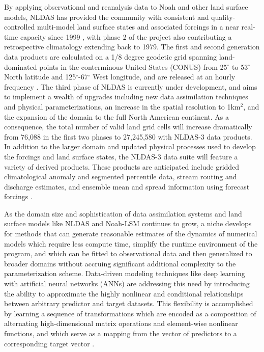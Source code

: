 By applying observational and reanalysis data to Noah and other land surface models, NLDAS has provided the community with consistent and quality-controlled multi-model land surface states and associated forcings in a near real-time capacity since 1999 \parencite{cosgrove_real-time_2003}, with phase 2 of the project also contributing a retrospective climatology extending back to 1979. The first and second generation data products are calculated on a 1/8 degree geodetic grid spanning land-dominated points in the conterminous United States (CONUS) from 25$^\circ$ to 53$^\circ$ North latitude and 125$^\circ$-67$^\circ$ West longitude, and are released at an hourly frequency  \parencite{mitchell_multi-institution_2004} \parencite{xia_continental-scale_2012}. The third phase of NLDAS is currently under development, and aims to implement a wealth of upgrades including new data assimilation techniques and physical parameterizations, an increase in the spatial resolution to 1km$^2$, and the expansion of the domain to the full North American continent. As a consequence, the total number of valid land grid cells will increase dramatically from 76,088 in the first two phases to 27,245,580 with NLDAS-3 data products. In addition to the larger domain and updated physical processes used to develop the forcings and land surface states, the NLDAS-3 data suite will feature a variety of derived products. These products are anticipated include gridded climatological anomaly and segmented percentile data, stream routing and discharge estimates, and ensemble mean and spread information using forecast forcings \parencite{kumar_north_2024}.

As the domain size and sophistication of data assimilation systems and land surface models like NLDAS and Noah-LSM continues to grow, a niche develops for methods that can generate reasonable estimates of the dynamics of numerical models which require less compute time, simplify the runtime environment of the program, and which can be fitted to observational data and then generalized to broader domains without accruing significant additional complexity to the parameterization scheme.  Data-driven modeling techniques like deep learning with artificial neural networks (ANNs) are addressing this need by introducing the ability to approximate the highly nonlinear and conditional relationships between arbitrary predictor and target datasets. This flexibility is accomplished by learning a sequence of transformations which are encoded as a composition of alternating high-dimensional matrix operations and element-wise nonlinear functions, and which serve as a mapping from the vector of predictors to a corresponding target vector \parencite{hornik_multilayer_1989}.

